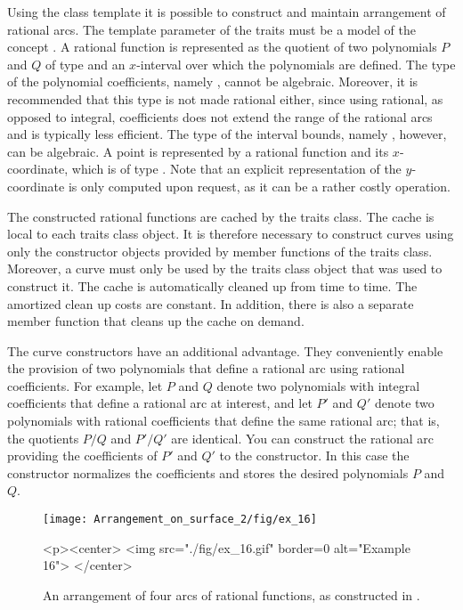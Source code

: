 Using the 
class template it is possible to construct and maintain arrangement
of rational arcs. The template parameter of the traits must be a model
of the concept . A rational function is
represented as the quotient of two polynomials $P$ and $Q$ of type
 and an $x$-interval over which
the polynomials are defined. The type of the polynomial coefficients,
namely , cannot be algebraic.
Moreover, it is recommended that this type is not made rational either,
since using rational, as opposed to integral, coefficients does not
extend the range of the rational arcs and is typically less efficient.
The type of the interval bounds, namely
, however, can be algebraic. A point is
represented by a rational function and its $x$-coordinate, which is of
type . Note that an explicit
representation of the $y$-coordinate is only computed upon request, as
it can be a rather costly operation.

The constructed rational functions are cached by the traits class. The
cache is local to each traits class object. It is therefore necessary
to construct curves using only the constructor objects provided by
member functions of the traits class.
Moreover, a curve must only be used by the traits class object that
was used to construct it. The cache is automatically cleaned up from
time to time. The amortized clean up costs are constant. In addition,
there is also a separate member function that cleans up the cache on
demand.

The curve constructors have an additional advantage. They conveniently
enable the provision of two polynomials that define a rational arc
using rational coefficients. For example, let $P$ and $Q$ denote two
polynomials with integral coefficients that define a rational arc at
interest, and let $P'$ and $Q'$ denote two polynomials with rational
coefficients that define the same rational arc; that is, the quotients
$P/Q$ and $P'/Q'$ are identical. You can construct the rational arc
providing the coefficients of $P'$ and $Q'$ to the constructor. In this
case the constructor normalizes the coefficients and stores the desired
polynomials $P$ and $Q$.

\begin{figure}[h]
\begin{ccTexOnly} 
  \begin{center}
  \texttt{[image: Arrangement\_on\_surface\_2/fig/ex\_16]}
  \end{center}
\end{ccTexOnly}
\begin{ccHtmlOnly}
  <p><center>
  <img src="./fig/ex_16.gif" border=0 alt="Example 16">
  </center>
\end{ccHtmlOnly}
\caption{An arrangement of four arcs of rational functions, as
constructed in .\label{arr_fig:ex_16}}
\end{figure}

